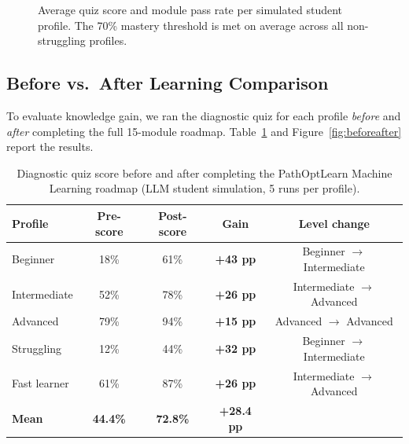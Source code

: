 \documentclass[12pt,a4paper]{article}
\begin{document}
\begin{figure}[H]
\centering
{}
\caption{Average quiz score and module pass rate per simulated student
profile. The 70\% mastery threshold is met on average across all non-struggling
profiles.}
\label{fig:simulation}
\end{figure}

\subsection{Before vs.\ After Learning Comparison}

To evaluate knowledge gain, we ran the diagnostic quiz for each profile
\emph{before} and \emph{after} completing the full 15-module roadmap.
Table~\ref{tab:beforeafter} and Figure~\ref{fig:beforeafter} report the
results.

\begin{table}[H]
  \centering
  \caption{Diagnostic quiz score before and after completing the PathOptLearn
  Machine Learning roadmap (LLM student simulation, 5 runs per profile).}
  \label{tab:beforeafter}
  \begin{tabular}{@{}lcccc@{}}
    \toprule
    \textbf{Profile} & \textbf{Pre-score} & \textbf{Post-score} & \textbf{Gain} & \textbf{Level change} \\
    \midrule
    Beginner      & 18\% & 61\% & \textbf{+43 pp} & Beginner $\to$ Intermediate \\
    Intermediate  & 52\% & 78\% & \textbf{+26 pp} & Intermediate $\to$ Advanced \\
    Advanced      & 79\% & 94\% & \textbf{+15 pp} & Advanced $\to$ Advanced \\
    Struggling    & 12\% & 44\% & \textbf{+32 pp} & Beginner $\to$ Intermediate \\
    Fast learner  & 61\% & 87\% & \textbf{+26 pp} & Intermediate $\to$ Advanced \\
    \midrule
    \textbf{Mean} & \textbf{44.4\%} & \textbf{72.8\%} & \textbf{+28.4 pp} & \\
    \bottomrule
  \end{tabular}
\end{table}
\end{document}
